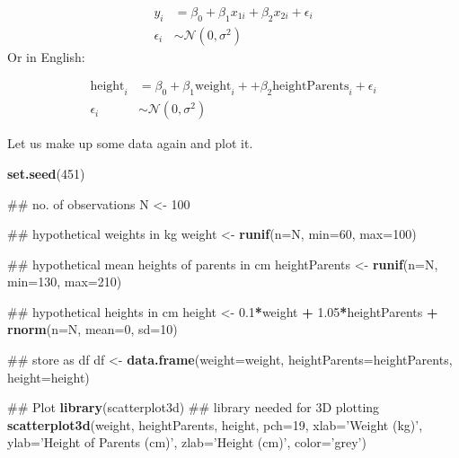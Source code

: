 \documentclass[]{book}
\newenvironment{Shaded}{\begin{snugshade}}{\end{snugshade}}
\newcommand{\KeywordTok}[1]{\textcolor[rgb]{0.13,0.29,0.53}{\textbf{#1}}}
\newcommand{\DataTypeTok}[1]{\textcolor[rgb]{0.13,0.29,0.53}{#1}}
\newcommand{\DecValTok}[1]{\textcolor[rgb]{0.00,0.00,0.81}{#1}}
\newcommand{\FloatTok}[1]{\textcolor[rgb]{0.00,0.00,0.81}{#1}}
\newcommand{\StringTok}[1]{\textcolor[rgb]{0.31,0.60,0.02}{#1}}
\newcommand{\OperatorTok}[1]{\textcolor[rgb]{0.81,0.36,0.00}{\textbf{#1}}}
\newcommand{\NormalTok}[1]{#1}
\theoremstyle{definition}
\theoremstyle{definition}
\theoremstyle{definition}
\theoremstyle{remark}
\begin{document}
\[
\begin{aligned}
y_i & = \beta_0 + \beta_1x_{1i} + \beta_2x_{2i} + \epsilon_i \\
\epsilon_i & \sim \mathcal{N}(0, \sigma^2)
\end{aligned}
\] Or in English:

\[
\begin{aligned}
\mathrm{height}_i & = \beta_0 + \beta_1\mathrm{weight}_i + + \beta_2\mathrm{heightParents}_i+ \epsilon_i \\
\epsilon_i & \sim \mathcal{N}(0, \sigma^2)
\end{aligned}
\]

Let us make up some data again and plot it.

\begin{Shaded}
\begin{Highlighting}[]
\KeywordTok{set.seed}\NormalTok{(}\DecValTok{451}\NormalTok{)}

\NormalTok{## no. of observations}
\NormalTok{N <-}\StringTok{ }\DecValTok{100} 

\NormalTok{## hypothetical weights in kg}
\NormalTok{weight <-}\StringTok{ }\KeywordTok{runif}\NormalTok{(}\DataTypeTok{n=}\NormalTok{N, }\DataTypeTok{min=}\DecValTok{60}\NormalTok{, }\DataTypeTok{max=}\DecValTok{100}\NormalTok{) }

\NormalTok{## hypothetical mean heights of parents in cm}
\NormalTok{heightParents <-}\StringTok{ }\KeywordTok{runif}\NormalTok{(}\DataTypeTok{n=}\NormalTok{N, }\DataTypeTok{min=}\DecValTok{130}\NormalTok{, }\DataTypeTok{max=}\DecValTok{210}\NormalTok{) }

\NormalTok{## hypothetical heights in cm}
\NormalTok{height <-}\StringTok{ }\FloatTok{0.1}\OperatorTok{*}\NormalTok{weight }\OperatorTok{+}\StringTok{ }\FloatTok{1.05}\OperatorTok{*}\NormalTok{heightParents }\OperatorTok{+}\StringTok{ }\KeywordTok{rnorm}\NormalTok{(}\DataTypeTok{n=}\NormalTok{N, }\DataTypeTok{mean=}\DecValTok{0}\NormalTok{, }\DataTypeTok{sd=}\DecValTok{10}\NormalTok{) }

\NormalTok{## store as df}
\NormalTok{df <-}\StringTok{ }\KeywordTok{data.frame}\NormalTok{(}\DataTypeTok{weight=}\NormalTok{weight, }\DataTypeTok{heightParents=}\NormalTok{heightParents, }\DataTypeTok{height=}\NormalTok{height) }

\NormalTok{## Plot}
\KeywordTok{library}\NormalTok{(scatterplot3d) ## library needed for 3D plotting}
\KeywordTok{scatterplot3d}\NormalTok{(weight, heightParents, height, }\DataTypeTok{pch=}\DecValTok{19}\NormalTok{, }\DataTypeTok{xlab=}\StringTok{'Weight (kg)'}\NormalTok{, }
              \DataTypeTok{ylab=}\StringTok{'Height of Parents (cm)'}\NormalTok{, }\DataTypeTok{zlab=}\StringTok{'Height (cm)'}\NormalTok{, }\DataTypeTok{color=}\StringTok{'grey'}\NormalTok{)}
\end{Highlighting}
\end{Shaded}
\end{document}
